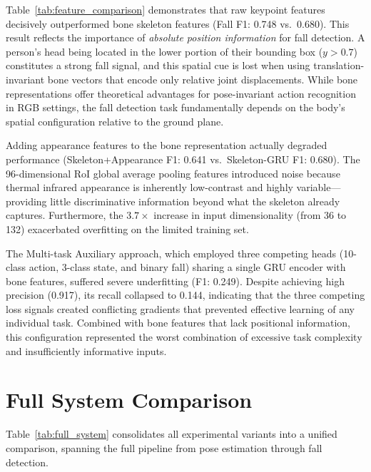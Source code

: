 Table~\ref{tab:feature_comparison} demonstrates that raw keypoint features decisively outperformed bone skeleton features (Fall F1: 0.748 vs.\ 0.680). This result reflects the importance of \emph{absolute position information} for fall detection. A person's head being located in the lower portion of their bounding box ($y > 0.7$) constitutes a strong fall signal, and this spatial cue is lost when using translation-invariant bone vectors that encode only relative joint displacements. While bone representations offer theoretical advantages for pose-invariant action recognition in RGB settings, the fall detection task fundamentally depends on the body's spatial configuration relative to the ground plane.

Adding appearance features to the bone representation actually degraded performance (Skeleton+Appearance F1: 0.641 vs.\ Skeleton-GRU F1: 0.680). The 96-dimensional RoI global average pooling features introduced noise because thermal infrared appearance is inherently low-contrast and highly variable---providing little discriminative information beyond what the skeleton already captures. Furthermore, the $3.7\times$ increase in input dimensionality (from 36 to 132) exacerbated overfitting on the limited training set.

The Multi-task Auxiliary approach, which employed three competing heads (10-class action, 3-class state, and binary fall) sharing a single GRU encoder with bone features, suffered severe underfitting (F1: 0.249). Despite achieving high precision (0.917), its recall collapsed to 0.144, indicating that the three competing loss signals created conflicting gradients that prevented effective learning of any individual task. Combined with bone features that lack positional information, this configuration represented the worst combination of excessive task complexity and insufficiently informative inputs.

\section{Full System Comparison}
\label{sec:full_system}

Table~\ref{tab:full_system} consolidates all experimental variants into a unified comparison, spanning the full pipeline from pose estimation through fall detection.

